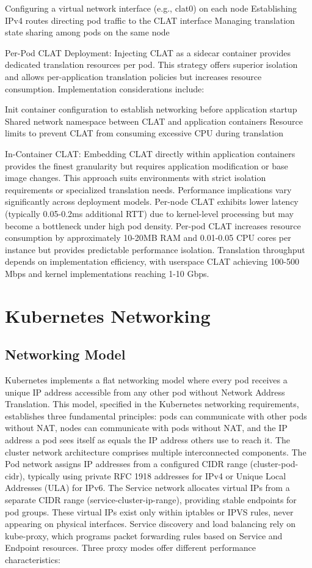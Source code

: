 Configuring a virtual network interface (e.g., clat0) on each node
Establishing IPv4 routes directing pod traffic to the CLAT interface
Managing translation state sharing among pods on the same node

Per-Pod CLAT Deployment: Injecting CLAT as a sidecar container provides dedicated translation resources per pod. This strategy offers superior isolation and allows per-application translation policies but increases resource consumption. Implementation considerations include:

Init container configuration to establish networking before application startup
Shared network namespace between CLAT and application containers
Resource limits to prevent CLAT from consuming excessive CPU during translation

In-Container CLAT: Embedding CLAT directly within application containers provides the finest granularity but requires application modification or base image changes. This approach suits environments with strict isolation requirements or specialized translation needs.
Performance implications vary significantly across deployment models. Per-node CLAT exhibits lower latency (typically 0.05-0.2ms additional RTT) due to kernel-level processing but may become a bottleneck under high pod density. Per-pod CLAT increases resource consumption by approximately 10-20MB RAM and 0.01-0.05 CPU cores per instance but provides predictable performance isolation. Translation throughput depends on implementation efficiency, with userspace CLAT achieving 100-500 Mbps and kernel implementations reaching 1-10 Gbps.

\section{Kubernetes Networking}

\subsection{Networking Model}
Kubernetes implements a flat networking model where every pod receives a unique IP address accessible from any other pod without Network Address Translation. This model, specified in the Kubernetes networking requirements, establishes three fundamental principles: pods can communicate with other pods without NAT, nodes can communicate with pods without NAT, and the IP address a pod sees itself as equals the IP address others use to reach it.
The cluster network architecture comprises multiple interconnected components. The Pod network assigns IP addresses from a configured CIDR range (cluster-pod-cidr), typically using private RFC 1918 addresses for IPv4 or Unique Local Addresses (ULA) for IPv6. The Service network allocates virtual IPs from a separate CIDR range (service-cluster-ip-range), providing stable endpoints for pod groups. These virtual IPs exist only within iptables or IPVS rules, never appearing on physical interfaces.
Service discovery and load balancing rely on kube-proxy, which programs packet forwarding rules based on Service and Endpoint resources. Three proxy modes offer different performance characteristics:

